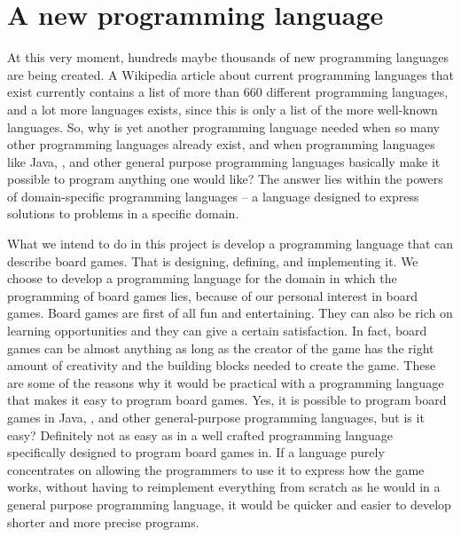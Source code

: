 \chapter{A new programming language}
\label{chap:introduction}
At this very moment, hundreds maybe thousands of new programming
languages are being created. A Wikipedia article about current
programming languages that exist currently contains a list of more than
$660$ different programming languages\cite{listofprogramminglanguages},
and a lot more languages exists, since this is only a list of the
more well-known languages. So, why is yet another programming
language needed when so many other programming languages already
exist, and when programming languages like Java, \CS{}, and
other general purpose programming languages basically make it
possible to program anything one would like? The answer lies
within the powers of domain-specific programming languages -- a
language designed to express solutions to problems in a specific
domain\cite{domainspecificprogramminglanguagedefinition}.

What we intend to do in this project is develop a programming language that can
describe board games. That is designing, defining, and implementing it. We
choose to develop a programming language for the domain in which the programming
of board games lies, because of our personal interest in board games.
Board games are first of all fun and entertaining. They can also be rich on
learning opportunities\cite{whyboardgames1?} and they can give a certain
satisfaction\cite{whyboardgames2?}. In fact, board games can be almost anything
as long as the creator of the game has the right amount of creativity and the
building blocks needed to create the game. These are some of the reasons why it
would be practical with a programming language that makes it easy to program
board games. Yes, it is possible to program board games in Java, \CS{}, and 
other general-purpose programming languages, but is it easy? Definitely not as
easy as in a well crafted programming language specifically designed to program
board games in. If a language purely concentrates on allowing the programmers to
use it to express how the game works, without having to reimplement everything
from scratch as he would in a general purpose programming language, it would be
quicker and easier to develop shorter and more precise programs.  

